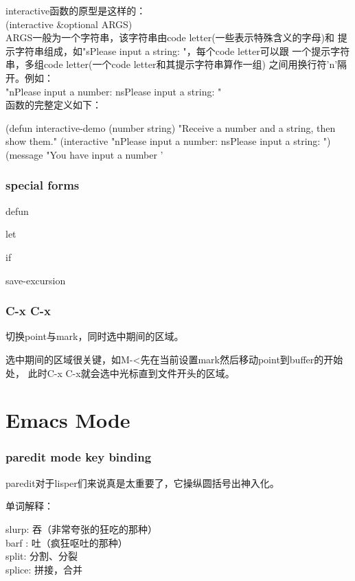 ﻿\documentclass[a4paper,11pt]{article}
\begin{document}
  interactive函数的原型是这样的：\\
  (interactive \&optional ARGS)\\
  ARGS一般为一个字符串，该字符串由code letter(一些表示特殊含义的字母)和
  提示字符串组成，如"sPlease input a string: "，每个code letter可以跟
  一个提示字符串，多组code letter(一个code letter和其提示字符串算作一组)
  之间用换行符'\bs n'隔开。例如：\\
  "nPlease input a number: \bs nsPlease input a string: "\\
  函数的完整定义如下：\\
  \begin{schemecode}
(defun interactive-demo (number string)
  "Receive a number and a string, then show them."
  (interactive "nPlease input a number: \bs nsPlease input a string: ")
  (message "You have input a number '%
  \end{schemecode}

  \section[special forms]{special forms}
  defun

  let

  if

  save-excursion

  \section[C-x C-x]{C-x C-x}
  切换point与mark，同时选中期间的区域。

  选中期间的区域很关键，如M-<先在当前设置mark然后移动point到buffer的开始处，
  此时C-x C-x就会选中光标直到文件开头的区域。


  \part[Emacs Mode]{Emacs Mode}

  \section[paredit mode key binding]{paredit mode key binding}
  paredit对于lisper们来说真是太重要了，它操纵圆括号出神入化。

  单词解释：\par
  slurp: 吞（非常夸张的狂吃的那种）\\
  barf : 吐（疯狂呕吐的那种）\\[10pt]
  split: 分割、分裂\\
  splice: 拼接，合并
  
\end{document}
